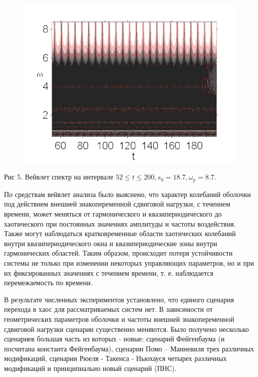 \documentclass[12pt,letterpaper]{extreport}
\begin{document}
\begin{center}
\begin{figure}
\centering
\includegraphics[scale=0.5]{ris5}
\end{figure}
Рис 5. Вейвлет спектр на интервале $52\leq t \leq 200, s_0=18.7, \omega_p = 8.7.$
\end{center}


\par По средствам вейвлет анализа было выяснено, что характер колебаний оболочки под действием внешней знакопеременной сдвиговой нагрузки, с течением времени, может меняться от гармонического и квазипериодического до хаотического при постоянных значениях амплитуды и частоты воздействия. Также могут наблюдаться кратковременные области хаотических колебаний внутри квазипериодического окна и квазипериодические зоны внутри гармонических областей. Таким образом, происходит потеря устойчивости системы не только при изменении некоторых управляющих параметров, но и при их фиксированных значениях с течением времени, т. е. наблюдается перемежаемость по времени.
\par В результате численных экспериментов установлено, что единого сценария перехода в хаос для рассматриваемых систем нет. В зависимости от геометрических параметров оболочки и частоты внешней знакопеременной сдвиговой нагрузки сценарии существенно меняются. Было получено несколько сценариев большая часть из которых - новые: сценарий Фейгенбаума (и посчитана константа Фейгенбаума), сценарии Помо – Манневиля трех различных модификаций, сценарии Рюеля - Такенса - Ньюхауся четырех различных модификаций и принципиально новый сценарий (ПНС).\\
\end{document}

